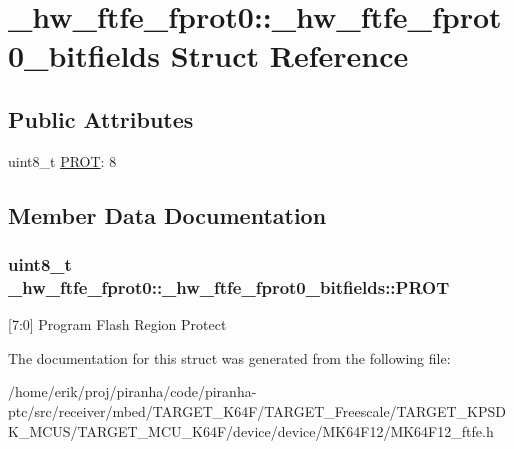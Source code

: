 \hypertarget{struct__hw__ftfe__fprot0_1_1__hw__ftfe__fprot0__bitfields}{}\section{\+\_\+hw\+\_\+ftfe\+\_\+fprot0\+:\+:\+\_\+hw\+\_\+ftfe\+\_\+fprot0\+\_\+bitfields Struct Reference}
\label{struct__hw__ftfe__fprot0_1_1__hw__ftfe__fprot0__bitfields}
\subsection*{Public Attributes}
\begin{DoxyCompactItemize}
\item 
uint8\+\_\+t \hyperlink{struct__hw__ftfe__fprot0_1_1__hw__ftfe__fprot0__bitfields_ae8c416508f227018d28af0f1eb72609d}{P\+R\+OT}\+: 8
\end{DoxyCompactItemize}


\subsection{Member Data Documentation}
\subsubsection[{\texorpdfstring{P\+R\+OT}{PROT}}]{\setlength{\rightskip}{0pt plus 5cm}uint8\+\_\+t \+\_\+hw\+\_\+ftfe\+\_\+fprot0\+::\+\_\+hw\+\_\+ftfe\+\_\+fprot0\+\_\+bitfields\+::\+P\+R\+OT}\hypertarget{struct__hw__ftfe__fprot0_1_1__hw__ftfe__fprot0__bitfields_ae8c416508f227018d28af0f1eb72609d}{}\label{struct__hw__ftfe__fprot0_1_1__hw__ftfe__fprot0__bitfields_ae8c416508f227018d28af0f1eb72609d}
\mbox{[}7\+:0\mbox{]} Program Flash Region Protect 

The documentation for this struct was generated from the following file\+:\begin{DoxyCompactItemize}
\item 
/home/erik/proj/piranha/code/piranha-\/ptc/src/receiver/mbed/\+T\+A\+R\+G\+E\+T\+\_\+\+K64\+F/\+T\+A\+R\+G\+E\+T\+\_\+\+Freescale/\+T\+A\+R\+G\+E\+T\+\_\+\+K\+P\+S\+D\+K\+\_\+\+M\+C\+U\+S/\+T\+A\+R\+G\+E\+T\+\_\+\+M\+C\+U\+\_\+\+K64\+F/device/device/\+M\+K64\+F12/M\+K64\+F12\+\_\+ftfe.\+h\end{DoxyCompactItemize}
